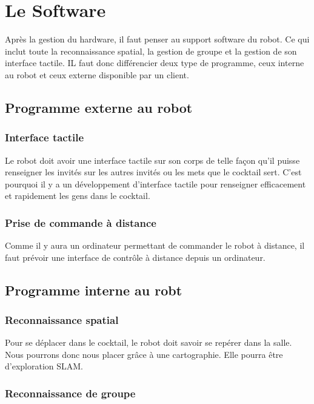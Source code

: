 \section{Le Software}

Après la gestion du hardware, il faut penser au support software du robot. Ce qui inclut toute la reconnaissance spatial, la gestion de groupe et la gestion de son interface tactile. IL faut donc différencier deux type de programme, ceux interne au robot et ceux externe disponible par un client.

\subsection{Programme externe au robot}

\subsubsection{Interface tactile}

Le robot doit avoir une interface tactile sur son corps de telle façon qu’il puisse renseigner les invités sur les autres invités ou les mets que le cocktail sert. C’est pourquoi il y a un développement d’interface tactile pour renseigner efficacement et rapidement les gens dans le cocktail.

\subsubsection{Prise de commande à distance}

Comme il y aura un ordinateur permettant de commander le robot à distance, il faut prévoir une interface de contrôle à distance depuis un ordinateur.

\subsection{Programme interne au robt}

\subsubsection{Reconnaissance spatial}

Pour se déplacer dans le cocktail, le robot doit savoir se repérer dans la salle. Nous pourrons donc nous placer grâce à une cartographie. Elle pourra être d’exploration SLAM.

\subsubsection{Reconnaissance de groupe}

